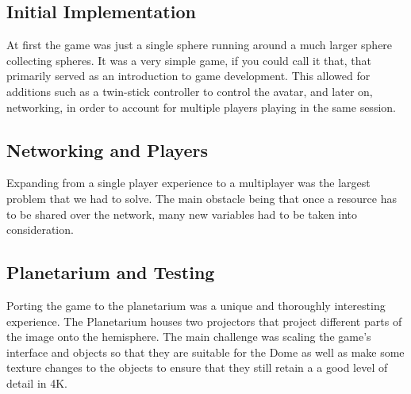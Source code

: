 \documentclass[11pt,a4paper]{article}
\begin{document}
        \subsection{Initial Implementation}
        At first the game was just a single sphere running around a much larger sphere collecting spheres. It was a very simple game, if you could call it that, that primarily served as an introduction to game development. This allowed for additions such as a twin-stick controller to control the avatar, and later on, networking, in order to account for multiple players playing in the same session.

        \subsection{Networking and Players}
        Expanding from a single player experience to a multiplayer was the largest problem that we had to solve. The main obstacle being that once a resource has to be shared over the network, many new variables had to be taken into consideration.

        \subsection{Planetarium and Testing}
        Porting the game to the planetarium was a unique and thoroughly interesting experience. The Planetarium houses two projectors that project different parts of the image onto the hemisphere. The main challenge was scaling the game's interface and objects so that they are suitable for the Dome as well as make some texture changes to the objects to ensure that they still retain a a good level of detail in 4K.
\end{document}
